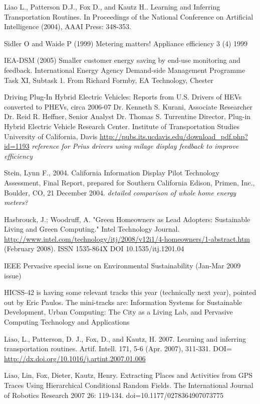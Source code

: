 Liao L., Patterson D.J., Fox D., and Kautz H.. Learning and Inferring Transportation Routines. In Proceedings of the National Conference on Artificial Intelligence (2004), AAAI Press: 348-353.

Sidler O and Waide P (1999) Metering matters! Appliance efficiency 3 (4) 1999

IEA-DSM (2005) Smaller customer energy saving by end-use monitoring and feedback. International Energy Agency Demand-side Management Programme Task XI, Subtask 1. From Richard Formby, EA Technology, Chester 

Driving Plug-In Hybrid Electric Vehicles: Reports from U.S. Drivers of HEVs  
converted to PHEVs, circa 2006-07 Dr. Kenneth S. Kurani, Associate Researcher 
Dr. Reid R. Heffner, Senior Analyst Dr. Thomas S. Turrentine Director, Plug-in Hybrid Electric Vehicle Research Center. Institute of Transportation Studies 
University of California, Davis \url{http://pubs.its.ucdavis.edu/download_pdf.php?id=1193} \emph{reference for Prius drivers using milage display feedback to improve efficiency}

Stein, Lynn F., 2004. California Information Display Pilot Technology Assessment, Final Report, prepared for Southern California Edison, Primen, Inc., Boulder, CO, 21 December 2004. \emph{detailed comparison of whole home energy meters?}

Hasbrouck, J.; Woodruff, A. "Green Homeowners as Lead Adopters: Sustainable Living and Green Computing." Intel Technology Journal. \url{http://www.intel.com/technology/itj/2008/v12i1/4-homeowners/1-abstract.htm} (February 2008). ISSN 1535-864X DOI 10.1535/itj.1201.04

IEEE Pervasive special issue on Environmental Sustainability (Jan-Mar 2009 issue)

HICSS-42 is having some relevant tracks this year (technically next year), pointed out by Eric Paulos. The mini-tracks are: Information Systems for Sustainable Development, Urban Computing: The City as a Living Lab, and Pervasive Computing Technology and Applications

Liao, L., Patterson, D. J., Fox, D., and Kautz, H. 2007. Learning and inferring transportation routines. Artif. Intell. 171, 5-6 (Apr. 2007), 311-331. DOI= \url{http://dx.doi.org/10.1016/j.artint.2007.01.006}

Liao, Lin, Fox, Dieter, Kautz, Henry. Extracting Places and Activities from GPS Traces Using Hierarchical Conditional Random Fields. The International Journal of Robotics Research 2007 26: 119-134. doi=10.1177/0278364907073775

